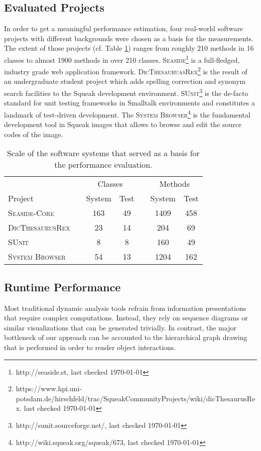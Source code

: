 \subsection{Evaluated Projects}
\label{ss:DiscussionProjects}
In order to get a meaningful performance estimation, four real-world software projects with different backgrounds were chosen as a basis for the measurements.
The extent of those projects (cf. Table \ref{t:EvaluationProjects}) ranges from roughly 210 methods in 16 classes to almost 1900 methods in over 210 classes.
\textsc{Seaside}\footnote{http://seaside.st, last checked \today} is a full-fledged, industry grade web application framework.
\textsc{DicThesauruasRex}\footnote{https://www.hpi.uni-potsdam.de/hirschfeld/trac/SqueakCommunityProjects/wiki/dicThesaurusRex. last checked \today} is the result of an undergraduate student project which adds spelling correction and synonym search facilities to the Squeak development environment.
\textsc{SUnit}\footnote{http://sunit.sourceforge.net/, last checked \today} is the de-facto standard for unit testing frameworks in Smalltalk environments and constitutes a landmark of test-driven development.
The \textsc{System Browser}\footnote{http://wiki.squeak.org/squeak/673, last checked \today} is the fundamental development tool in Squeak images that allows to browse and edit the source codes of the image.

\begin{table}
\centering
\begin{tabular}{lcccccc}
\toprule[1.5pt]
\phantom{abc} & \phantom{abc} & \multicolumn{2}{c}{Classes} & \phantom{abc} & \multicolumn{2}{c}{Methods}  \\
\cmidrule{3-4} \cmidrule{6-7}
Project    && System & Test && System & Test \\
\midrule
\textsc{Seaside-Core}		&&	163	&	49	&&	1409	&	458	\\
\textsc{DicThesaurusRex}	&&	23	&	14	&&	204		&	69	\\
\textsc{SUnit}				&&	8	&	8	&&	160		&	49	\\
\textsc{System Browser}		&&	54	&	13	&&	1204	&	162	\\
\bottomrule[1.5pt]
\end{tabular}
\caption[Evaluated Software Systems]{Scale of the software systems that served as a basis for the performance evaluation.}
\label{t:EvaluationProjects}
\end{table}

\subsection{Runtime Performance}
\label{ss:DiscussionPerformance}
Most traditional dynamic analysis tools refrain from information presentations that require complex computations.
Instead, they rely on sequence diagrams or similar visualizations that can be generated trivially.
In contrast, the major bottleneck of our approach can be accounted to the hierarchical graph drawing that is performed in order to render object interactions.

